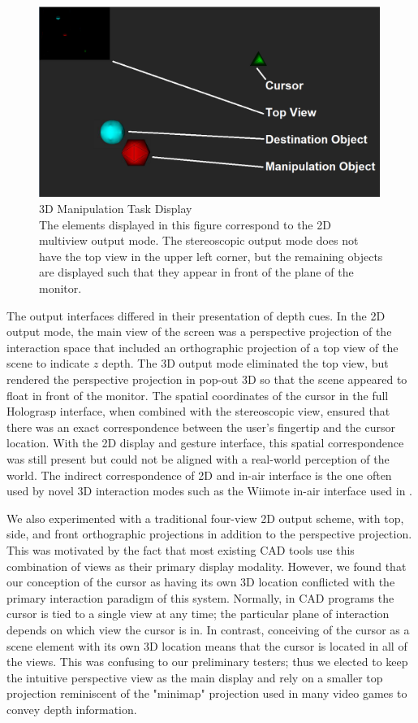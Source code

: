 \documentclass[pageno]{jpaper}
\begin{document}
\begin{figure}
\centering
\includegraphics[width=0.99\textwidth]{figures/labelledexperiment.png}
\caption{3D Manipulation Task Display \\
The elements displayed in this figure correspond to the 2D multiview output mode. The stereoscopic
output mode does not have the top view in the upper left corner, but the remaining objects are displayed
such that they appear in front of the plane of the monitor.}
\label{fig:experimentdisplay}
\end{figure}

The output interfaces differed in their presentation of depth cues. In the 2D output mode,
the main view of the screen was a perspective projection of the interaction space that
included an orthographic projection of a top view of the scene to indicate $z$ depth. The 3D output mode eliminated the top
view, but rendered the perspective projection in pop-out 3D so that the scene appeared to
float in front of the monitor. The spatial coordinates of the cursor in the full Holograsp interface, when combined
with the stereoscopic view, ensured that there was an exact correspondence between the user's fingertip
and the cursor location. With the 2D display and gesture interface, this spatial correspondence was still present but could not
be aligned with a real-world perception of the world. The indirect correspondence of 2D and in-air interface is the one
often used by novel 3D interaction modes such as the Wiimote in-air interface used in \cite{study1}.

We also experimented with a traditional four-view 2D output
scheme, with top, side, and front orthographic projections in addition to the perspective projection.
This was motivated by the fact that most existing CAD tools use this combination of views as their
primary display modality. However, we found that our conception of the cursor as having its own
3D location conflicted with the primary interaction paradigm of this system. Normally, in CAD programs
the cursor is tied to a single view at any time; the particular plane of interaction depends on which view
the cursor is in. In contrast, conceiving of the cursor as a scene element with its own 3D location means
that the cursor is located in all of the views. This was confusing to our preliminary testers; thus we elected to keep the intuitive perspective view as the
main display and rely on a smaller top projection reminiscent of the "minimap" projection used in many
video games to convey depth information.
\end{document}
